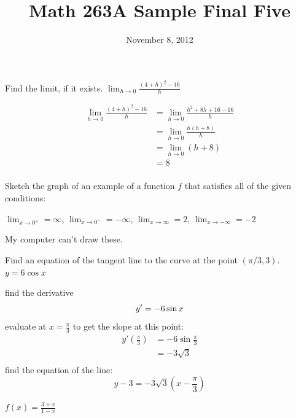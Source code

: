 \documentclass[fleqn,addpoints]{exam}
\title{Math 263A Sample Final Five}
\date{November 8, 2012}
\author{}
\begin{document}

\maketitle  

\begin{questions}

\question
Find the limit, if it exists. $\lim_{h \to 0} \frac{(4 + h)^2 - 16}{h}$

\begin{solution}
\begin{align*}
  \lim_{h \to 0} \frac{(4 + h)^2 - 16}{h} &= \lim_{h \to 0} \frac{h^2 + 8h + 16 - 16}{h} \\
  &= \lim_{h \to 0} \frac{h(h + 8)}{h} \\
  &= \lim_{h \to 0} (h + 8) \\
  &= 8 \\
\end{align*}

\end{solution}

\question
Sketch the graph of an example of a function $f$ that satisfies all of the given conditions: 

$\lim_{x \to 0^+} = \infty$, $\lim_{x \to 0^-} = -\infty$, $\lim_{x \to \infty} = 2$, $\lim_{x \to -\infty} = -2$

\begin{solution}
  My computer can't draw these.
\end{solution}

\ifprintanswers
\pagebreak
\fi

\question
Find an equation of the tangent line to the curve at the point $\left( \pi/3, 3 \right)$. $y = 6 \cos x$

\begin{solution}
find the derivative
\[
  y' = -6 \sin x \\
\]
evaluate at $x = \frac{\pi}{3}$ to get the slope at this point:
\begin{align*}
  y' \left( \frac{\pi}{3} \right) &= -6 \sin \frac{\pi}{3} \\
  &= -3 \sqrt{3} \\
\end{align*}
find the equation of the line:
\[
  y - 3 = -3 \sqrt{3} \left(x - \frac{\pi}{3} \right)
\]
\end{solution}

\ifprintanswers
\pagebreak
\fi

\question $f(x)= \frac{3 + x}{1 - x}$
\begin{parts}

\end{parts}
\end{questions}
\end{document}
